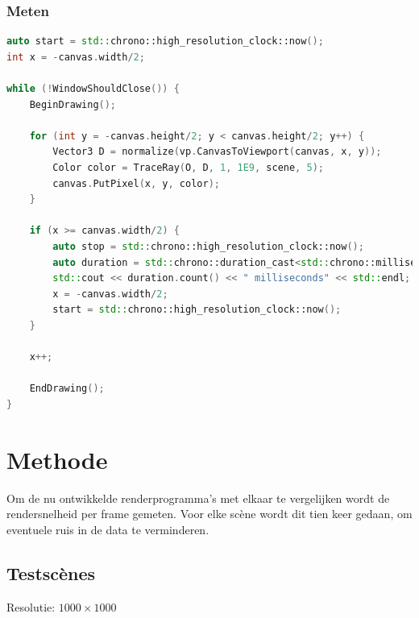 \documentclass[12pt, a4paper]{article}
\begin{document}
\subsubsection{Meten}
\begin{lstlisting}[language=c++]
auto start = std::chrono::high_resolution_clock::now();
int x = -canvas.width/2;

while (!WindowShouldClose()) {
	BeginDrawing();

	for (int y = -canvas.height/2; y < canvas.height/2; y++) {
		Vector3 D = normalize(vp.CanvasToViewport(canvas, x, y));
		Color color = TraceRay(O, D, 1, 1E9, scene, 5);
		canvas.PutPixel(x, y, color);
	}
	
	if (x >= canvas.width/2) {
		auto stop = std::chrono::high_resolution_clock::now();
		auto duration = std::chrono::duration_cast<std::chrono::milliseconds>(stop - start);
		std::cout << duration.count() << " milliseconds" << std::endl;
		x = -canvas.width/2;
		start = std::chrono::high_resolution_clock::now();
	}
	
	x++;
	
	EndDrawing();
}
\end{lstlisting}

\clearpage
\section{Methode}
Om de nu ontwikkelde renderprogramma's met elkaar te vergelijken wordt de rendersnelheid per frame gemeten. Voor elke scène wordt dit tien keer gedaan, om eventuele ruis in de data te verminderen. 
\subsection{Testscènes}
Resolutie: $1000\times 1000$
\end{document}
